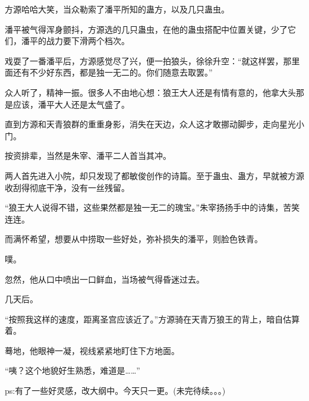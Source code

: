 \begin{this_body}
方源哈哈大笑，当众勒索了潘平所知的蛊方，以及几只蛊虫。

潘平被气得浑身颤抖，方源选的几只蛊虫，在他的蛊虫搭配中位置关键，少了它们，潘平的战力要下滑两个档次。

戏耍了一番潘平后，方源感觉尽了兴，便一拍狼头，徐徐升空：“就这样罢，那里面还有不少好东西，都是独一无二的。你们随意去取罢。”

众人听了，精神一振。很多人不由地心想：狼王大人还是有情有意的，他拿大头那是应该，潘平大人还是太气盛了。

直到方源和天青狼群的重重身影，消失在天边，众人这才敢挪动脚步，走向星光小门。

按资排辈，当然是朱宰、潘平二人首当其冲。

两人首先进入小院，却只发现了都敏俊创作的诗篇。至于蛊虫、蛊方，早就被方源收刮得彻底干净，没有一丝残留。

“狼王大人说得不错，这些果然都是独一无二的瑰宝。”朱宰扬扬手中的诗集，苦笑连连。

而满怀希望，想要从中捞取一些好处，弥补损失的潘平，则脸色铁青。

噗。

忽然，他从口中喷出一口鲜血，当场被气得昏迷过去。

几天后。

“按照我这样的速度，距离圣宫应该近了。”方源骑在天青万狼王的背上，暗自估算着。

蓦地，他眼神一凝，视线紧紧地盯住下方地面。

“咦？这个地貌好生熟悉，难道是……”

ps:有了一些好灵感，改大纲中。今天只一更。(未完待续。。。)

\end{this_body}

